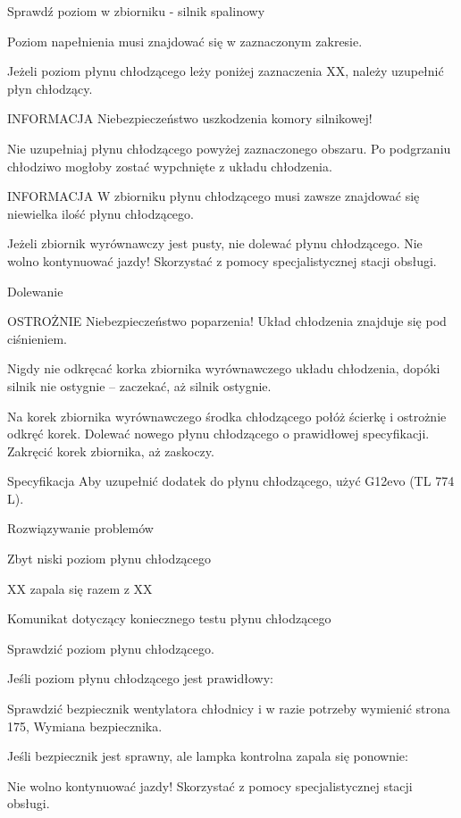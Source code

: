 Sprawdź poziom w zbiorniku - silnik spalinowy


Poziom napełnienia musi znajdować się w zaznaczonym zakresie.
\begin{itemizeArrow}
	\itemArrow Jeżeli poziom płynu chłodzącego leży poniżej zaznaczenia XX, należy uzupełnić płyn chłodzący.
\end{itemizeArrow}

INFORMACJA
Niebezpieczeństwo uszkodzenia komory silnikowej!
\begin{itemizeTriangle}
	\itemTriangle Nie uzupełniaj płynu chłodzącego powyżej zaznaczonego obszaru. Po podgrzaniu chłodziwo mogłoby zostać wypchnięte z układu chłodzenia.
\end{itemizeTriangle}

INFORMACJA
W zbiorniku płynu chłodzącego musi zawsze znajdować się niewielka ilość płynu chłodzącego.
\begin{itemizeTriangle}
	\itemTriangle Jeżeli zbiornik wyrównawczy jest pusty, nie dolewać płynu chłodzącego.
	\itemTriangle Nie wolno kontynuować jazdy! Skorzystać z pomocy specjalistycznej stacji obsługi.
\end{itemizeTriangle}

Dolewanie

OSTROŻNIE
Niebezpieczeństwo poparzenia!
Układ chłodzenia znajduje się pod ciśnieniem.
\begin{itemizeTriangle}
	\itemTriangle Nigdy nie odkręcać korka zbiornika wyrównawczego układu chłodzenia, dopóki silnik nie ostygnie -- zaczekać, aż silnik ostygnie.
	\begin{itemizeArrow}
		\itemArrow Na korek zbiornika wyrównawczego środka chłodzącego połóż ścierkę i ostrożnie odkręć korek.
		\itemArrow Dolewać nowego płynu chłodzącego o prawidłowej specyfikacji.
		\itemArrow Zakręcić korek zbiornika, aż zaskoczy.
	\end{itemizeArrow}
\end{itemizeTriangle}

Specyfikacja
Aby uzupełnić dodatek do płynu chłodzącego, użyć G12evo (TL 774 L).

Rozwiązywanie problemów

Zbyt niski poziom płynu chłodzącego

XX zapala się razem z XX

Komunikat dotyczący koniecznego testu płynu chłodzącego
\begin{itemizeArrow}
	\itemArrow Sprawdzić poziom płynu chłodzącego.
\end{itemizeArrow}
Jeśli poziom płynu chłodzącego jest prawidłowy:
\begin{itemizeArrow}
	\itemArrow Sprawdzić bezpiecznik wentylatora chłodnicy i w razie potrzeby wymienić \guillemotright strona 175, Wymiana bezpiecznika.
\end{itemizeArrow}
Jeśli bezpiecznik jest sprawny, ale lampka kontrolna zapala się ponownie:
\begin{itemizeArrow}
	\itemArrow Nie wolno kontynuować jazdy! Skorzystać z pomocy specjalistycznej stacji obsługi.
\end{itemizeArrow}

